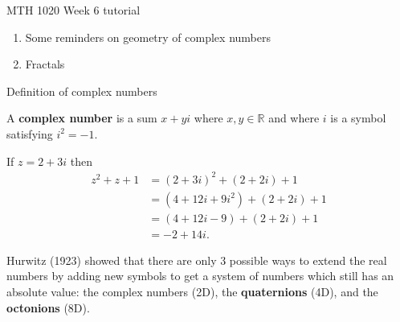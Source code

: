 \documentclass[aspectratio=169]{beamer}
\begin{document}
\begin{frame}{MTH 1020 Week 6 tutorial}
\begin{enumerate}
  \item Some reminders on geometry of complex numbers
  \item Fractals
\end{enumerate}
\end{frame}

\begin{frame}{Definition of complex numbers}

\begin{definition}
A \textbf{complex number} is a sum $ x + y i $ where $ x, y \in \mathbb{R} $ and where $ i $ is a symbol satisfying $ i^2 = -1 $.
\end{definition}

\begin{example}
  If $ z = 2 + 3i $ then
  \begin{align*}
    z^2 + z + 1 &= (2 + 3i)^2 + (2+2i) + 1\\
                &= (4 + 12i + 9i^2) + (2+2i) + 1\\
                &= (4 + 12i - 9) + (2+2i) + 1\\
                &= -2 + 14i.
  \end{align*}
\end{example}

Hurwitz (1923) showed that there are only 3 possible ways to extend the real numbers by adding new symbols to get a system of numbers which still has an absolute value:
the complex numbers (2D), the \textbf{quaternions} (4D), and the \textbf{octonions} (8D).

\end{frame}
\end{document}
